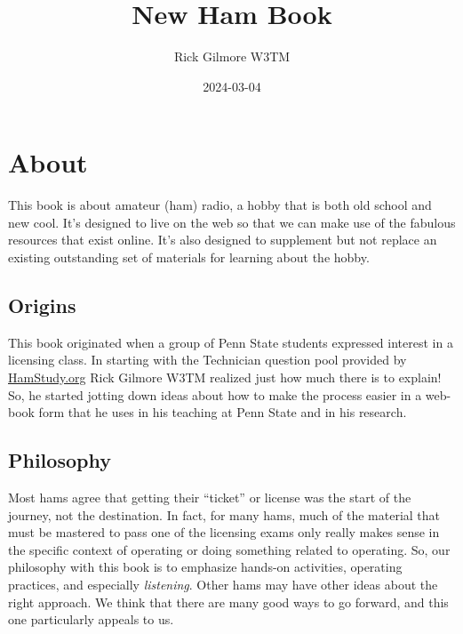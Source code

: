 \documentclass[
  letterpaper,
  DIV=11,
  numbers=noendperiod]{scrreport}
\title{New Ham Book}
\author{Rick Gilmore W3TM}
\date{2024-03-04}
\renewcommand*\contentsname{Table of contents}
\newcommand\contentsname{Table of contents}
\begin{document}
\maketitle
\ifdefined\Shaded\renewenvironment{Shaded}{\begin{tcolorbox}[boxrule=0pt, interior hidden, frame hidden, borderline west={3pt}{0pt}{shadecolor}, breakable, sharp corners, enhanced]}{\end{tcolorbox}}\fi

\renewcommand*\contentsname{Table of contents}
{
\hypersetup{linkcolor=}
\setcounter{tocdepth}{2}
\tableofcontents
}

\hypertarget{about}{%
\chapter{About}\label{about}}

This book is about amateur (ham) radio, a hobby that is both old school
and new cool. It's designed to live on the web so that we can make use
of the fabulous resources that exist online. It's also designed to
supplement but not replace an existing outstanding set of materials for
learning about the hobby.

\hypertarget{origins}{%
\section{Origins}\label{origins}}

This book originated when a group of Penn State students expressed
interest in a licensing class. In starting with the Technician question
pool provided by \href{https://hamstudy.org}{HamStudy.org} Rick Gilmore
W3TM realized just how much there is to explain! So, he started jotting
down ideas about how to make the process easier in a web-book form that
he uses in his teaching at Penn State and in his research.

\hypertarget{philosophy}{%
\section{Philosophy}\label{philosophy}}

Most hams agree that getting their ``ticket'' or license was the start
of the journey, not the destination. In fact, for many hams, much of the
material that must be mastered to pass one of the licensing exams only
really makes sense in the specific context of operating or doing
something related to operating. So, our philosophy with this book is to
emphasize hands-on activities, operating practices, and especially
\emph{listening}. Other hams may have other ideas about the right
approach. We think that there are many good ways to go forward, and this
one particularly appeals to us.
\end{document}
